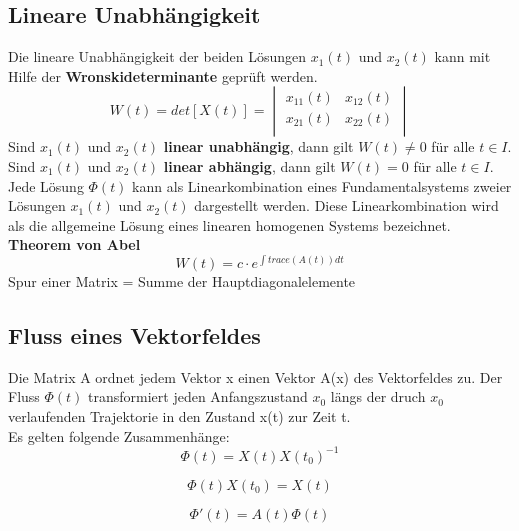 \subsection{Lineare Unabhängigkeit}
Die lineare Unabhängigkeit der beiden Lösungen $x_1(t)$ und $x_2(t)$ kann mit Hilfe der \textbf{Wronskideterminante} geprüft werden. 
\begin{equation*}
	W(t) = det[X(t)] =    
	\begin{vmatrix} 
	        x_{11}(t) & x_{12}(t)\\ 
	        x_{21}(t) & x_{22}(t)\\   
	\end{vmatrix}
\end{equation*}
Sind $x_1(t)$ und $x_2(t)$ \textbf{linear unabhängig}, dann gilt $W(t) \neq 0$ für alle $t \in I$. \\
Sind $x_1(t)$ und $x_2(t)$ \textbf{linear abhängig}, dann gilt $W(t) = 0$ für alle $t \in I$. \\
Jede Lösung $\Phi(t)$ kann als Linearkombination eines Fundamentalsystems zweier Lösungen $x_1(t)$ und $x_2(t)$ dargestellt werden. Diese Linearkombination wird als die allgemeine Lösung eines linearen homogenen Systems bezeichnet. \\
\textbf{Theorem von Abel}\\
\begin{equation*}
W(t) = c\cdot e^{\int{trace(A(t))dt}}
\end{equation*}
Spur einer Matrix = Summe der Hauptdiagonalelemente
\subsection{Fluss eines Vektorfeldes}
Die Matrix A ordnet jedem Vektor x einen Vektor A(x) des Vektorfeldes zu. Der Fluss $\Phi(t)$ transformiert jeden Anfangszustand $x_0$ längs der druch $x_0$ verlaufenden Trajektorie in den Zustand x(t) zur Zeit t. \\
Es gelten folgende Zusammenhänge:\\
\begin{equation*}
\Phi(t) = X(t)X(t_0)^{-1}
\end{equation*}

\begin{equation*}
\Phi(t)X(t_0) = X(t)
\end{equation*}

\begin{equation*}
\Phi'(t) = A(t)\Phi(t)
\end{equation*}

